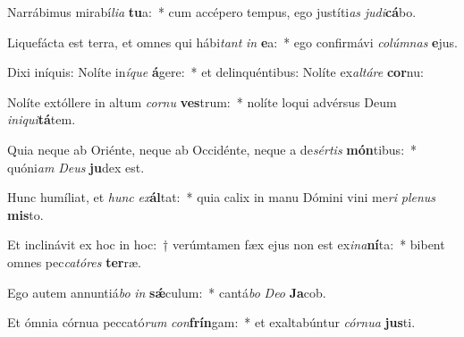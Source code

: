 \item Narrábimus mirabí\textit{li}\textit{a} \textbf{tu}a:~* cum accépero tempus, ego justíti\textit{as} \textit{ju}\textit{di}\textbf{cá}bo.
\item Liquefácta est terra, et omnes qui hábi\textit{tant} \textit{in} \textbf{e}a:~* ego confirmávi \textit{co}\textit{lúm}\textit{nas} \textbf{e}jus.
\item Dixi iníquis: Nolíte in\textit{í}\textit{que} \textbf{á}gere:~* et delinquéntibus: Nolíte ex\textit{al}\textit{tá}\textit{re} \textbf{cor}nu:
\item Nolíte extóllere in altum \textit{cor}\textit{nu} \textbf{ves}trum:~* nolíte loqui advérsus Deum \textit{in}\textit{i}\textit{qui}\textbf{tá}tem.
\item Quia neque ab Oriénte, neque ab Occidénte, neque a de\textit{sér}\textit{tis} \textbf{món}tibus:~* quóni\textit{am} \textit{De}\textit{us} \textbf{ju}dex est.
\item Hunc humíliat, et \textit{hunc} \textit{ex}\textbf{ál}tat:~* quia calix in manu Dómini vini me\textit{ri} \textit{ple}\textit{nus} \textbf{mis}to.
\item Et inclinávit ex hoc in hoc:~† verúmtamen fæx ejus non est ex\textit{i}\textit{na}\textbf{ní}ta:~* bibent omnes pec\textit{ca}\textit{tó}\textit{res} \textbf{ter}ræ.
\item Ego autem annuntiá\textit{bo} \textit{in} \textbf{sǽ}culum:~* cantá\textit{bo} \textit{De}\textit{o} \textbf{Ja}cob.
\item Et ómnia córnua peccató\textit{rum} \textit{con}\textbf{frín}gam:~* et exaltabúntur \textit{cór}\textit{nu}\textit{a} \textbf{jus}ti.
